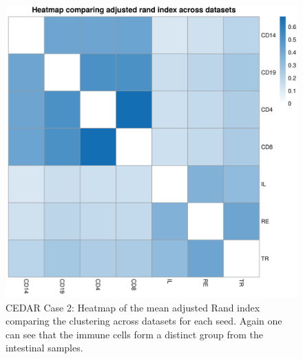 \documentclass[14pt]{extarticle} %
\begin{document}
	\begin{figure}[h]
		\centering
		\includegraphics[scale=0.75]{Images/Biology_data/Set_1000/All_datasets/Arandi_heatmap.png}
		\caption{CEDAR Case 2: Heatmap of the mean adjusted Rand index comparing the clustering across datasets for each seed. Again one can see that the immune cells form a distinct group from the intestinal samples.}
		\label{fig:results:cedar_2:mdi_adj_rand_ind_heatmap}
	\end{figure}
	
	
\end{document}

